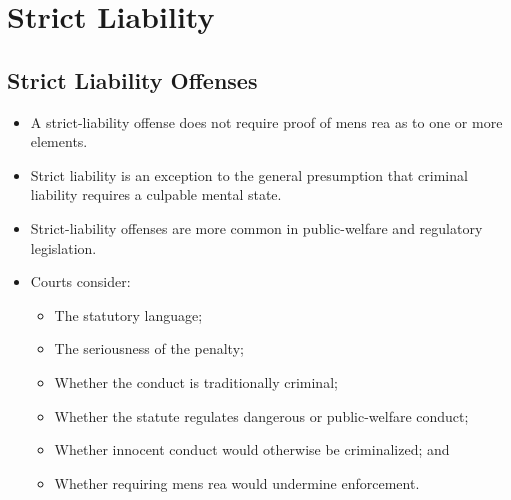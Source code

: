 \documentclass[11pt]{tex/lawoutline}
\begin{document}


\section{Strict Liability}

\subsection{Strict Liability Offenses}{
\begin{itemize}
    \item A strict-liability offense does not require proof of mens rea as to one or more elements.
    \item Strict liability is an exception to the general presumption that criminal liability requires a culpable mental state.
    \item Strict-liability offenses are more common in public-welfare and regulatory legislation.
    \item Courts consider:
    \begin{itemize}
        \item The statutory language;
        \item The seriousness of the penalty;
        \item Whether the conduct is traditionally criminal;
        \item Whether the statute regulates dangerous or public-welfare conduct;
        \item Whether innocent conduct would otherwise be criminalized; and
        \item Whether requiring mens rea would undermine enforcement.
    \end{itemize}
\end{itemize}
}
\end{document}
